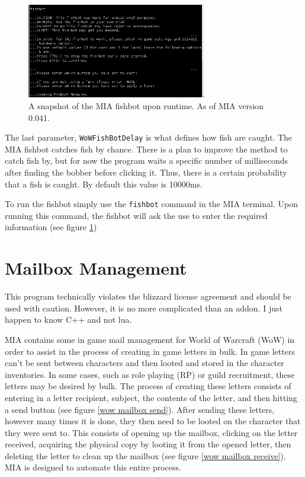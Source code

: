 \begin{figure}[h]
	\centering
	\includegraphics[width=0.7\textwidth]{images/fishbot_MIA.png}
	\caption{A snapshot of the MIA fishbot upon runtime. As of MIA version 0.041.} \label{fishbot terminal}
\end{figure}

The last parameter, \texttt{WoWFishBotDelay} is what defines how fish are caught. The MIA fishbot catches fish by chance. There is a plan to improve the method to catch fish by, but for now the program waits a specific number of milliseconds after finding the bobber before clicking it. Thus, there is a certain probability that a fish is caught. By default this value is 10000ms.

To run the fishbot simply use the \texttt{fishbot} command in the MIA terminal. Upon running this command, the fishbot will ask the use to enter the required information (see figure \ref{fishbot terminal})

\section{Mailbox Management} \label{WoWMailbox}

\begin{note}
	This program technically violates the blizzard license agreement and should be used with caution. However, it is no more complicated than an addon. I just happen to know C++ and not lua.
\end{note}

MIA contains some in game mail management for World of Warcraft (WoW) in order to assist in the process of creating in game letters in bulk. In game letters can't be sent between characters and then looted and stored in the character inventories. In some cases, such as role playing (RP) or guild recruitment, these letters may be desired by bulk. The process of creating these letters consists of entering in a letter recipient, subject, the contents of the letter, and then hitting a send button (see figure \ref{wow mailbox send}). After sending these letters, however many times it is done, they then need to be looted on the character that they were sent to. This consists of opening up the mailbox, clicking on the letter received, acquiring the physical copy by looting it from the opened letter, then deleting the letter to clean up the mailbox (see figure \ref{wow mailbox receive}). MIA is designed to automate this entire process.

